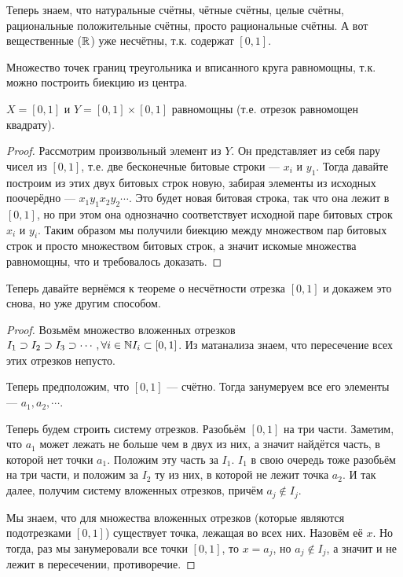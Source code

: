 Теперь знаем, что натуральные счётны, чётные счётны, целые счётны, рациональные положительные счётны, просто рациональные счётны. А вот вещественные ($\mathbb{R}$) уже несчётны, т.к. содержат $[0, 1]$.

\begin{example}
	Множество точек границ треугольника и вписанного круга равномощны, т.к. можно построить биекцию из центра. 
\end{example}

\begin{theorem}
	$X = [0, 1]$ и $Y = [0, 1] \times [0, 1]$ равномощны (т.е. отрезок равномощен квадрату).
\end{theorem}
\begin{proof}
	Рассмотрим произвольный элемент из $Y$. Он представляет из себя пару чисел из $[0, 1]$, т.е. две бесконечные битовые строки --- $x_i$ и $y_1$. Тогда давайте построим из этих двух битовых строк новую, забирая элементы из исходных поочерёдно --- $x_1 y_1 x_2 y_2 \cdots$. Это будет новая битовая строка, так что она лежит в $[0, 1]$, но при этом она однозначно соответствует исходной паре битовых строк $x_i$ и $y_i$. Таким образом мы получили биекцию между множеством пар битовых строк и просто множеством битовых строк, а значит искомые множества равномощны, что и требовалось доказать.
\end{proof}

Теперь давайте вернёмся к теореме о несчётности отрезка $[0, 1]$ и докажем это снова, но уже другим способом.

\begin{proof}
	Возьмём множество вложенных отрезков $I_1 \supset I_2 \supset I_3 \supset \cdots, \forall i \in \mathbb{N} I_i \subset [0, 1]$. Из матанализа знаем, что пересечение всех этих отрезков непусто. 

	Теперь предположим, что $[0, 1]$ --- счётно. Тогда занумеруем все его элементы --- $a_1, a_2, \cdots$. 

	Теперь будем строить систему отрезков. Разобьём $[0, 1]$ на три части. Заметим, что $a_1$ может лежать не больше чем в двух из них, а значит найдётся часть, в которой нет точки $a_1$. Положим эту часть за $I_1$. $I_1$ в свою очередь тоже разобьём на три части, и положим за $I_2$ ту из них, в которой не лежит точка $a_2$. И так далее, получим систему вложенных отрезков, причём $a_j \not \in I_j$.

	Мы знаем, что для множества вложенных отрезков (которые являются подотрезками $[0, 1]$) существует точка, лежащая во всех них. Назовём её $x$. Но тогда, раз мы занумеровали все точки $[0, 1]$, то $x = a_j$, но $a_j \not \in I_j$, а значит и не лежит в пересечении, противоречие.
\end{proof}

